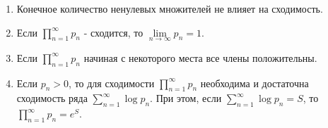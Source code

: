 \begin{properties} \thmslashn

    \begin{enumerate}
        \item Конечное количество ненулевых множителей не влияет на сходимость.
        \item Если $\prod\limits_{n=1}^{\infty} p_{n}$ - сходится, то $\lim\limits_{n \to \infty} p_{n} = 1$.
        \item Если $\prod\limits_{n=1}^{\infty} p_{n}$ начиная с некоторого места все члены положительны.
        \item Если $p_{n} > 0$, то для сходимости $\prod\limits_{n=1}^{\infty}  p_{n}$ необходима и достаточна сходимость ряда $\sum\limits_{n=1}^{\infty}\log p_{n}$. При этом, если $\sum\limits_{n=1}^{\infty} \log p_{n} = S$, то $\prod\limits_{n=1}^{\infty} p_{n} = e^{S}$.
    \end{enumerate}
\end{properties}
